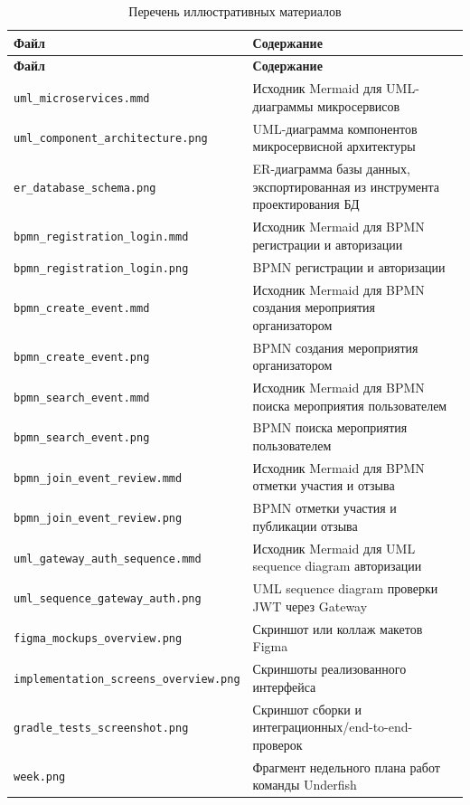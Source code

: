 \begin{longtable}{|p{6cm}|p{9cm}|}
\caption{Перечень иллюстративных материалов}\label{tab:figures}\\
\hline
\textbf{Файл} & \textbf{Содержание} \\
\hline
\endfirsthead
\hline
\textbf{Файл} & \textbf{Содержание} \\
\hline
\endhead
\nolinkurl{uml_microservices.mmd} & Исходник Mermaid для UML-диаграммы микросервисов \\
\hline
\nolinkurl{uml_component_architecture.png} & UML-диаграмма компонентов микросервисной архитектуры \\
\hline
\nolinkurl{er_database_schema.png} & ER-диаграмма базы данных, экспортированная из инструмента проектирования БД \\
\hline
\nolinkurl{bpmn_registration_login.mmd} & Исходник Mermaid для BPMN регистрации и авторизации \\
\hline
\nolinkurl{bpmn_registration_login.png} & BPMN регистрации и авторизации \\
\hline
\nolinkurl{bpmn_create_event.mmd} & Исходник Mermaid для BPMN создания мероприятия организатором \\
\hline
\nolinkurl{bpmn_create_event.png} & BPMN создания мероприятия организатором \\
\hline
\nolinkurl{bpmn_search_event.mmd} & Исходник Mermaid для BPMN поиска мероприятия пользователем \\
\hline
\nolinkurl{bpmn_search_event.png} & BPMN поиска мероприятия пользователем \\
\hline
\nolinkurl{bpmn_join_event_review.mmd} & Исходник Mermaid для BPMN отметки участия и отзыва \\
\hline
\nolinkurl{bpmn_join_event_review.png} & BPMN отметки участия и публикации отзыва \\
\hline
\nolinkurl{uml_gateway_auth_sequence.mmd} & Исходник Mermaid для UML sequence diagram авторизации \\
\hline
\nolinkurl{uml_sequence_gateway_auth.png} & UML sequence diagram проверки JWT через Gateway \\
\hline
\nolinkurl{figma_mockups_overview.png} & Скриншот или коллаж макетов Figma \\
\hline
\nolinkurl{implementation_screens_overview.png} & Скриншоты реализованного интерфейса \\
\hline
\nolinkurl{gradle_tests_screenshot.png} & Скриншот сборки и интеграционных/end-to-end-проверок \\
\hline
\nolinkurl{week.png} & Фрагмент недельного плана работ команды Underfish \\
\hline
\end{longtable}

